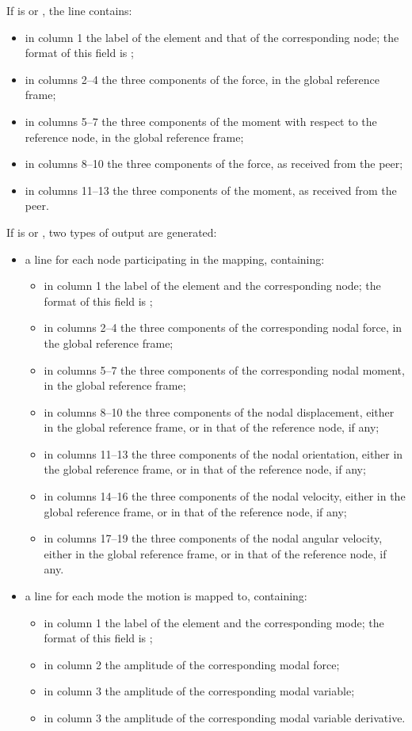 If  is  or , the line contains:
\begin{itemize}
\item in column 1 the label of the element and that of the corresponding node;
	the format of this field is ;
\item in columns 2--4 the three components of the force,
	in the global reference frame;
\item in columns 5--7 the three components of the moment
	with respect to the reference node,
	in the global reference frame;
\item in columns 8--10 the three components of the force,
	as received from the peer;
\item in columns 11--13 the three components of the moment,
	as received from the peer.
\end{itemize}
If  is  or , two types of output are generated:
\begin{itemize}
\item a line for each node participating in the mapping, containing:
\begin{itemize}
\item in column 1 the label of the element and the corresponding node;
	the format of this field is ;
\item in columns 2--4 the three components of the corresponding nodal force,
	in the global reference frame;
\item in columns 5--7 the three components of the corresponding nodal moment,
	in the global reference frame;
\item in columns 8--10 the three components of the nodal displacement,
	either in the global reference frame, or in that of the reference node,
	if any;
\item in columns 11--13 the three components of the nodal orientation,
	either in the global reference frame, or in that of the reference node,
	if any;
\item in columns 14--16 the three components of the nodal velocity,
	either in the global reference frame, or in that of the reference node,
	if any;
\item in columns 17--19 the three components of the nodal angular velocity,
	either in the global reference frame, or in that of the reference node,
	if any.
\end{itemize}

\item a line for each mode the motion is mapped to, containing:
\begin{itemize}
\item in column 1 the label of the element and the corresponding mode;
	the format of this field is ;
\item in column 2 the amplitude of the corresponding modal force;
\item in column 3 the amplitude of the corresponding modal variable;
\item in column 3 the amplitude of the corresponding modal variable derivative.
\end{itemize}
\end{itemize}
